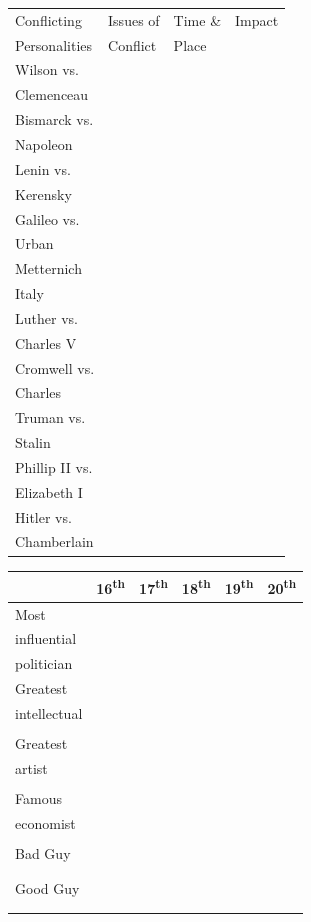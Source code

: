 \documentclass[12pt]{article}
\begin{document}
\begin{enumerate}
\begin{tabular}{|l|l|l|l|}
\hline
Conflicting & Issues of & Time \& & Impact \\
Personalities & Conflict & Place & \\
\hline
Wilson vs. & & & \\
Clemenceau & & & \\
\hline
Bismarck vs. & & & \\
Napoleon & & & \\
\hline
Lenin vs. & & & \\
Kerensky  & & & \\
\hline
Galileo vs. & & & \\
Urban & & & \\
\hline
Metternich & & & \\
Italy & & & \\
\hline
Luther vs. & & & \\
Charles V & & & \\
\hline
Cromwell vs. & & & \\
Charles & & & \\
\hline
Truman vs. & & & \\
Stalin & & & \\
\hline
Phillip II vs. & & & \\
Elizabeth I & & & \\
\hline
Hitler vs. & & & \\
Chamberlain & & & \\
\hline


\end{tabular}

\begin{tabular}{|l|l|l|l|l|l|}

\hline
 & 16\textsuperscript{th} & 17\textsuperscript{th} & 18\textsuperscript{th} & 19\textsuperscript{th} & 20\textsuperscript{th} \\
\hline
Most & & & & & \\
influential & & & & & \\
politician & & & & & \\
\hline
Greatest & & & & & \\
intellectual & & & & & \\
& & & & & \\
\hline
Greatest & & & & & \\
artist & & & & & \\
& & & & & \\
\hline
Famous & & & & & \\
economist & & & & & \\
    & & & & & \\
\hline
Bad Guy & & & & & \\
    & & & & & \\
    & & & & & \\
\hline
Good Guy & & & & & \\
    & & & & & \\
    & & & & & \\
\hline


\end{tabular}
\end{enumerate}
\end{document}
